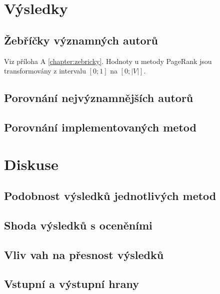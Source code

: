 \documentclass[12pt,titlepage]{report}
\begin{document}





\chapter{Výsledky}
\section{Žebříčky významných autorů}
Viz příloha A \ref{chapter:zebricky}. Hodnoty u metody PageRank jsou
transformovány z intervalu $[0; 1]$ na $[0; |V|]$.
\section{Porovnání nejvýznamnějších autorů}
\section{Porovnání implementovaných metod}


\chapter{Diskuse}
\section{Podobnost výsledků jednotlivých metod}
\section{Shoda výsledků s oceněními}
\section{Vliv vah na přesnost výsledků}
\section{Vstupní a výstupní hrany}
\end{document}
